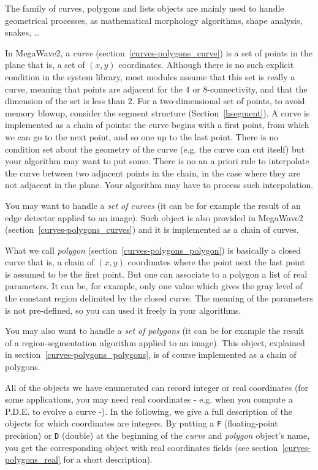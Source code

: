 %


The family of curves, polygons and lists objects are mainly used to handle geometrical
processes, as mathematical morphology algorithms, shape analysis, snakes, \ldots

In MegaWave2, a {\em curve} (section~\ref{curves-polygons_curve}) is a set of 
points in the plane that is, a set of $(x,y)$ coordinates. 
Although there is no such explicit condition in the system library, most modules assume that 
this set is really a curve, meaning that points are adjacent for the $4$ or $8$-connectivity,
and that the dimension of the set is less than $2$. For a two-dimensional set of points,
to avoid memory blowup, consider the segment structure (Section~\ref{hsegment}).
A curve is implemented as a chain of points:
the curve begins with a first point, from which we can go to the next 
point, and so one up to the last point. 
There is no condition set about the geometry of the curve (e.g. the curve can
cut itself) but your algorithm may want to put some. 
There is no an a priori rule to interpolate the curve between two adjacent points
in the chain, in the case where they are not adjacent in the plane. Your algorithm may
have to process such interpolation.

You may want to handle a {\em set of curves} (it can be for example the result of an edge detector applied to an image). 
Such object is also provided in MegaWave2 (section~\ref{curves-polygons_curves}) and it is implemented as a chain of curves.

What we call {\em polygon} (section~\ref{curves-polygons_polygon}) is basically a closed curve that is, a chain of $(x,y)$ coordinates where the point next the last point is assumed to be the first point. 
But one can associate to a polygon a list of real parameters.
It can be, for example, only one value which gives the gray level of the
constant region delimited by the closed curve. 
The meaning of the parameters is not pre-defined, so you can used it freely
in your algorithms. 

You may also want to handle a {\em set of polygons} (it can be for example the result of a region-segmentation algorithm applied to an image).
This object, explained in section~\ref{curves-polygons_polygons}, is of course
implemented as a chain of polygons.

All of the objects we have enumerated can record integer or real coordinates 
(for some 
applications, you may need real coordinates - e.g. when you compute a P.D.E. 
to evolve a curve -). 
In the following, we give a full description of the objects for which 
coordinates are integers.
By putting a \verb+F+ (floating-point precision) or \verb+D+ (double) at the beginning
of the {\em curve} and {\em polygon} object's name, you get the corresponding 
object with real coordinates 
fields (see section~\ref{curves-polygons_real} for a short description).

